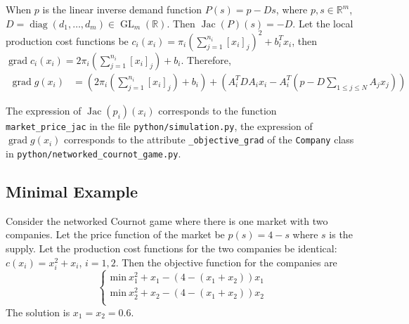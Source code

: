 When $p$ is the linear inverse demand function $P(s) = p − Ds$, where $p, s \in \mathbb{R}^m$, $D = \operatorname{diag}(d_1, \ldots, d_m) \in \operatorname{GL}_m(\mathbb{R})$. Then $\operatorname{Jac}(P)(s) = -D$. Let the local production cost functions be $c_i(x_i) = \pi_i \left(\sum\limits_{j=1}^{n_i} [x_i]_j\right)^2 + b_i^Tx_i$, then $\operatorname{grad} c_i(x_i) = 2\pi_i \left(\sum\limits_{j=1}^{n_i} [x_i]_j\right) + b_i$. Therefore,
\begin{align*}
\operatorname{grad} g(x_i) & = \left(2\pi_i \left(\sum\limits_{j=1}^{n_i} [x_i]_j\right) + b_i \right) + \left( A_i^TDA_ix_i - A_i^T \left( p - D\sum\limits_{1 \leqslant j \leqslant N} A_jx_j \right) \right)
\end{align*}

The expression of $\operatorname{Jac}(p_i)(x_i)$ corresponds to the function \texttt{market\_price\_jac} in the file \texttt{python/simulation.py}, the expression of $\operatorname{grad} g(x_i)$ corresponds to the attribute \texttt{\_objective\_grad} of the \texttt{Company} class in \texttt{python/networked\_cournot\_game.py}.


\subsection*{Minimal Example}

Consider the networked Cournot game where there is one market with two companies. Let the price function of the market be $p(s) = 4 - s$ where $s$ is the supply. Let the production cost functions for the two companies be identical: $c(x_i) = x_i^2 + x_i$, $i = 1, 2$. Then the objective function for the companies are
$$\begin{cases}
\text{min} \ x_1^2 + x_1 - (4 - (x_1 + x_2)) x_1 \\
\text{min} \ x_2^2 + x_2 - (4 - (x_1 + x_2)) x_2 \\
\end{cases}$$
The solution is $x_1 = x_2 = 0.6.$


\printbibliography
